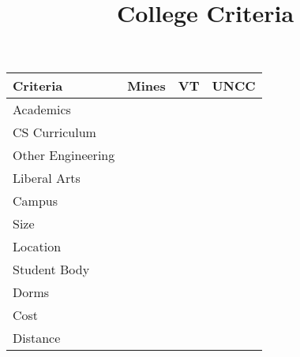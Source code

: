 \documentclass{article}
\title{College Criteria}
\date{}
\begin{document}
\maketitle

\centering
\begin{tabular}{p{3cm}p{1cm}p{1cm}p{1cm}}
    Criteria & Mines & VT & UNCC \\
    \toprule
    Academics           & & & \\
    CS Curriculum       & & & \\
    Other Engineering   & & & \\
    Liberal Arts        & & & \\
    Campus              & & & \\
    Size                & & & \\
    Location            & & & \\
    Student Body        & & & \\
    Dorms               & & & \\
    Cost                & & & \\
    Distance            & & & \\
\end{tabular}
\end{document}

